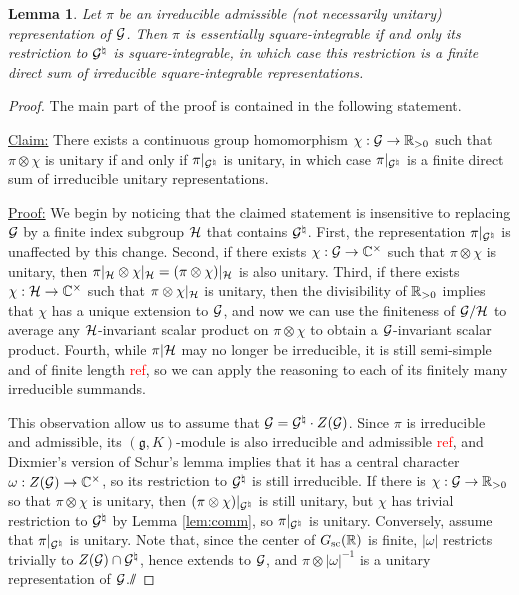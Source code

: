 \documentclass{article}
\newtheorem{lem}[thm]{Lemma}
\theoremstyle{definition}
\numberwithin{equation}{section}
\renewcommand{\-}{\hyp{}}
\newcommand{\g}{\mathfrak g}
\begin{document}
\begin{lem} \label{lem:eds-equiv}
  Let $\pi$ be an irreducible admissible (not necessarily unitary) representation of $\mathcal{G}$.
  Then $\pi$ is essentially square-integrable if and only its restriction to $\mathcal{G}^\natural$ is square-integrable, in which case this restriction is a finite direct sum of irreducible square-integrable representations.
\end{lem}
\begin{proof}
The main part of the proof is contained in the following statement.

\ul{Claim:} There exists a continuous group homomorphism $\chi : \mathcal{G} \to \mathbb{R}_{>0}$ such that $\pi\otimes\chi$ is unitary if and only if $\pi|_{\mathcal{G}^{\natural}}$ is unitary, in which case $\pi|_{\mathcal{G}^{\natural}}$ is a finite direct sum of irreducible unitary representations.

\ul{Proof:} We begin by noticing that the claimed statement is insensitive to replacing $\mathcal{G}$ by a finite index subgroup $\mathcal{H}$ that contains $\mathcal{G}^\natural$. First, the representation $\pi|_{\mathcal{G}^\natural}$ is unaffected by this change. Second, if there exists $\chi : \mathcal{G} \to \mathbb{C}^\times$ such that $\pi \otimes \chi$ is unitary, then $\pi|_{\mathcal{H}} \otimes \chi|_{\mathcal{H}} = (\pi\otimes\chi)|_{\mathcal{H}}$ is also unitary. Third, if there exists $\chi : \mathcal{H} \to \mathbb{C}^\times$ such that $\pi \otimes \chi|_{\mathcal{H}}$ is unitary, then the divisibility of $\mathbb{R}_{>0}$ implies that $\chi$ has a unique extension to $\mathcal{G}$, and now we can use the finiteness of $\mathcal{G}/\mathcal{H}$ to average any $\mathcal{H}$-invariant scalar product on $\pi\otimes\chi$ to obtain a $\mathcal{G}$-invariant scalar product. Fourth, while $\pi|\mathcal{H}$ may no longer be irreducible, it is still semi-simple and of finite length \textcolor{red}{ref}, so we can apply the reasoning to each of its finitely many irreducible summands.

This observation allow us to assume that $\mathcal{G}=\mathcal{G}^\natural \cdot Z(\mathcal{G})$. Since $\pi$ is irreducible and admissible, its $(\g,K)$-module is also irreducible and admissible \textcolor{red}{ref}, and Dixmier's version of Schur's lemma
\cite[Lemma 0.5.3]{wallach}
implies that it has a central character
$\omega : Z(\mathcal{G}) \to \mathbb{C}^\times$, so its restriction to $\mathcal{G}^\natural$ is still irreducible. If there is $\chi : \mathcal{G} \to \mathbb{R}_{>0}$ so that $\pi \otimes \chi$ is unitary, then $(\pi\otimes\chi)|_{\mathcal{G}^\natural}$ is still unitary, but $\chi$ has trivial restriction to $\mathcal{G}^\natural$ by Lemma \ref{lem:comm}, so $\pi|_{\mathcal{G}^\natural}$ is unitary. Conversely, assume that $\pi|_{\mathcal{G}^\natural}$ is unitary. Note that, since the center of $G_{\textrm{sc}}(\mathbb{R})$ is finite, $|\omega|$ restricts trivially to $Z(\mathcal{G}) \cap \mathcal{G}^\natural$, hence extends to $\mathcal{G}$, and $\pi\otimes|\omega|^{-1}$ is a unitary representation of $\mathcal{G}$.\hfill $\sslash$


\end{proof}
\end{document}
